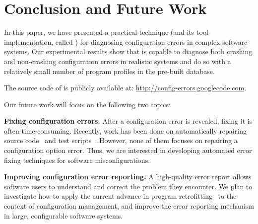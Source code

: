 \section{Conclusion and Future Work}

In this paper, we have presented a practical technique (and
its tool implementation, called \ourtool) for diagnosing
configuration errors in complex software systems.
Our experimental results show that \ourtool is capable
to diagnose both crashing and non-crashing configuration errors
in realistic systems and do so with a
relatively small number of program profiles in the pre-built database.

The source code of \ourtool is publicly available at:
\url{http://config-errors.googlecode.com}.

\vspace{1mm}

Our future
work will focus on the following two topics:

\textbf{Fixing configuration errors.} After a configuration error
is revealed, fixing it is often time-consuming. Recently, work has
been done on automatically
repairing source code~\cite{} and test scripts~\cite{}. However, none
of them focuses on repairing a configuration option error. Thus, we
are interested in developing automated error fixing techniques
for software misconfigurations.

\textbf{Improving configuration error reporting.} A high-quality
error report allows software users to understand and correct the problem
they encounter. 
We plan to investigate how to apply the current advance in
program  retrofitting~\cite{} to the context of configuration management,
and improve the error reporting mechanism in large, configurable software systems.








